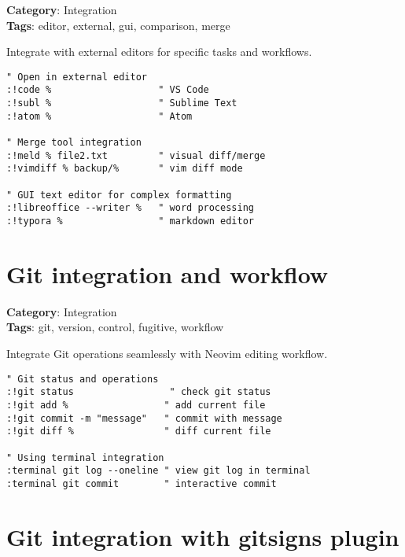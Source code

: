 {{{{{{\textbf{Category}: Integration\\ \textbf{Tags}: editor, external, gui, comparison, merge
\vspace{0.5cm}

Integrate with external editors for specific tasks and workflows.

\begin{Exa*}{}
\begin{Verbatim}[fontsize=\footnotesize, breaklines, breakanywhere]
" Open in external editor
:!code %                   " VS Code
:!subl %                   " Sublime Text
:!atom %                   " Atom

" Merge tool integration
:!meld % file2.txt         " visual diff/merge
:!vimdiff % backup/%       " vim diff mode

" GUI text editor for complex formatting
:!libreoffice --writer %   " word processing
:!typora %                 " markdown editor
\end{Verbatim}
\end{Exa*}

\section{Git integration and workflow}

\textbf{Category}: Integration\\ \textbf{Tags}: git, version, control, fugitive, workflow
\vspace{0.5cm}

Integrate Git operations seamlessly with Neovim editing workflow.

\begin{Exa*}{}
\begin{Verbatim}[fontsize=\footnotesize, breaklines, breakanywhere]
" Git status and operations
:!git status                 " check git status
:!git add %                 " add current file
:!git commit -m "message"   " commit with message
:!git diff %                " diff current file

" Using terminal integration
:terminal git log --oneline " view git log in terminal
:terminal git commit        " interactive commit
\end{Verbatim}
\end{Exa*}

\section{Git integration with gitsigns plugin}

}}}}}}

